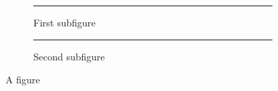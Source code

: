 \documentclass{beamer}
\begin{document}
\begin{frame}
\begin{figure}
    \begin{subfigure}[b]{.45\linewidth}
        \centering
        \caption{First subfigure}
        \label{fig:a}
        \textcolor{blue}{\rule{3cm}{3cm}}
    \end{subfigure}
    \begin{subfigure}[b]{.45\linewidth}
        \centering
        \caption{Second subfigure}
        \label{fig:b}
        \textcolor{blue}{\rule{3cm}{3cm}}
    \end{subfigure}
\caption{A figure}\label{fig:1}
\end{figure}
\end{frame}
\end{document}
